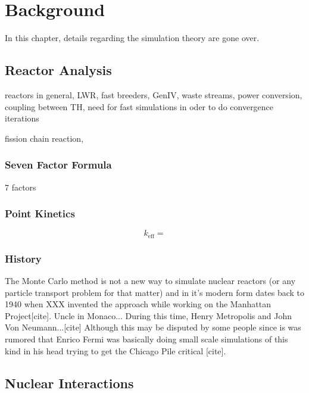 \chapter{Background}
\label{chap:background}

In this chapter, details regarding the simulation theory are gone over.  

\section{Reactor Analysis}

reactors in general, LWR, fast breeders, GenIV, waste streams, power conversion, coupling between TH, need for fast simulations in oder to do convergence iterations

fission chain reaction, 

\subsection{Seven Factor Formula}
 7 factors

\subsection{Point Kinetics}

\begin{equation}
\label{keff}
k_\mathrm{eff} = 
\end{equation}







\subsection{History}

The Monte Carlo method is not a new way to simulate nuclear reactors (or any particle transport problem for that matter) and in it's modern form dates back to 1940 when XXX invented the approach while working on the Manhattan Project[cite]. Uncle in Monaco...  During this time, Henry Metropolis and John Von Neumann...[cite]  Although this may be disputed by some people since is was rumored that Enrico Fermi was basically doing small scale simulations of this kind in his head trying to get the Chicago Pile critical [cite].


\section{Nuclear Interactions}
\label{subsec:interactions}

